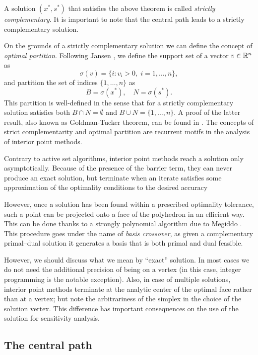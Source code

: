 A solution $(x^*,s^*)$ that satisfies the above theorem is called 
{\em strictly complementary}. 
It is important to note that the central path leads to a strictly 
complementary solution.

On the grounds of a strictly complementary
solution we can define the concept of {\em optimal partition}.
Following Jansen \cite{phd:Jansen}, we define the support set
of a vector $v \in \mathbb{R}^n$ as
\[
   \sigma(v) = \{ i : v_i > 0, \; i=1,\ldots,n \},
\]
and partition the set of indices $\{1,\ldots,n \}$ as
\[
   B = \sigma(x^*), \quad N = \sigma(s^*).
\]
This partition is well-defined in the sense that for a 
strictly complementary solution satisfies both 
$B \cap N = \emptyset$ and $B \cup N = \{1,\ldots,n \}$. 
A proof of the latter result, also known as Goldman-Tucker theorem, 
can be found in \cite{ipm:Wright97}.
The concepts of strict complementarity and optimal partition are
recurrent motifs in the analysis of interior point methods.

Contrary to active set algorithms, interior point methods reach a
solution only asymptotically. 
Because of the presence of the barrier term, they can never produce
an exact solution, but terminate when an iterate satisfies
some approximation of the optimality conditions to the desired accuracy

However, once a solution has been found within a prescribed 
optimality tolerance, such a point can be projected onto a face 
of the polyhedron in an efficient way.
This can be done thanks to a strongly polynomial algorithm due
to Megiddo \cite{Megiddo91}. This procedure goes under the name
of {\em basis crossover}, 
as given a complementary primal--dual solution it generates a basis 
that is both primal and dual feasible.

However, we should discuss what we mean by ``exact'' solution. In most
cases we do not need the additional precision of being on a vertex (in
this case, integer programming is the notable exception).
Also, in case of multiple solutions, interior point methods terminate
at the analytic center of the optimal face rather than at a vertex; 
but note the arbitrariness of the simplex in the choice of the solution
vertex.
This difference has important consequences on the use of the solution
for sensitivity analysis. 


%
%
\subsection{The central path}
\label{sec:CentralPath}

